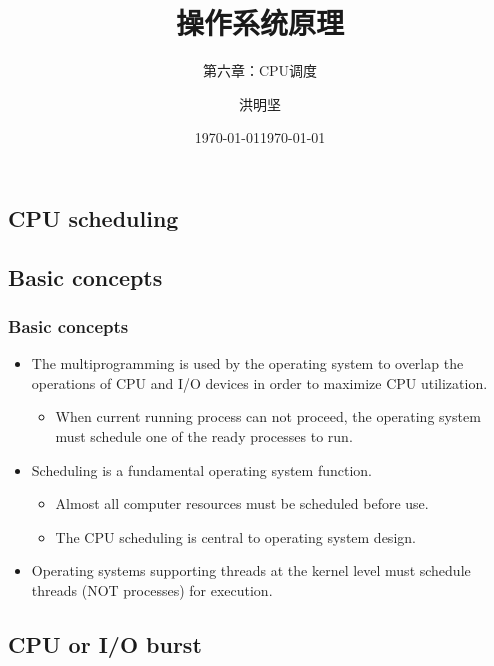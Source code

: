 \documentclass[CJKutf8,dvipsnames,table]{beamer}
\title{操作系统原理}
\subtitle{第六章：CPU调度}
\author{洪明坚}
\institute{重庆大学软件学院}
\date{\today}
\newif\ifxetexorluatex %
\begin{document}
\ifxetexorluatex\else
\begin{CJK*}{UTF8}{song}
\fi


  \date{\today}
  \frame{\titlepage}


  \section{CPU scheduling}

  \subsection{Basic concepts}
  
  \begin{frame}
  \frametitle{Basic concepts} \pause
  \begin{itemize}
  \item The multiprogramming is used by the operating system to overlap the operations of CPU and I/O devices in order to maximize CPU utilization.  \pause
    \begin{itemize}
    \item When current running process can not proceed, the operating system must schedule one of the ready processes to run.  \pause
    \end{itemize}
  \item Scheduling is a fundamental operating system function.  \pause
    \begin{itemize}
    \item Almost all computer resources must be scheduled before use.  \pause
    \item The CPU scheduling is central to operating system design.  \pause
    \end{itemize}
  \item Operating systems supporting threads at the kernel level must schedule threads (NOT processes) for execution.  
  \end{itemize}
  \end{frame}
  
  \subsection{CPU or I/O burst}


\end{CJK*}
\end{document}
